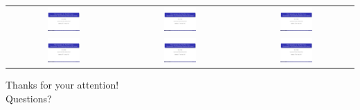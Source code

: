 \documentclass{beamer}
\begin{document}
\begin{frame}
\begin{tabular}{ccc}
\includegraphics[page=10, width=0.3\textwidth]{ali.pdf} &
\includegraphics[page=15, width=0.3\textwidth]{ali.pdf} &
\includegraphics[page=16, width=0.3\textwidth]{ali.pdf} \\

\includegraphics[page=22, width=0.3\textwidth]{ali.pdf} &
\includegraphics[page=26, width=0.3\textwidth]{ali.pdf} &
\includegraphics[page=30, width=0.3\textwidth]{ali.pdf} \\




\end{tabular}

\begin{block}{}
\centering Thanks for your attention!\\
Questions?
\end{block}
\end{frame}
\end{document}
